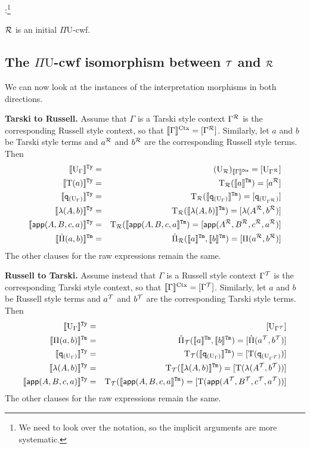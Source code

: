 \documentclass{lmcs}
\def\UU{\mathrm{U}}
\def\Ta{\mathrm{T}}
\def\Pihat{\hat{\Pi}}
\newcommand{\intCtxU}[1]{\llbracket #1 \rrbracket^\RawCtx}
\newcommand{\intTyU}[1]{\llbracket #1 \rrbracket^\RawTy}
\newcommand{\intTmU}[1]{\llbracket #1 \rrbracket^\RawTm}
\begin{document}
:\footnote{We need to look over the notation, so the implicit arguments are more systematic.}

\begin{thm}\label{theom:initial_cwf}
  $\mathcal{R}$ is an initial $\Pi\UU$-cwf.
\end{thm}

\subsection{The $\Pi\UU$-cwf isomorphism between ${\mathcal T}$ and $\mathcal{R}$}
We can now look at the instances of the interpretation morphisms in both directions.

{\bf Tarski to Russell.} Assume that $\Gamma$ is a Tarski style context $\Gamma^{\mathcal{R}}$ is the corresponding Russell style context, so that $\llbracket \Gamma \rrbracket^{\mathrm{Ctx}} = [ \Gamma^{\mathcal{R}} ]$. Similarly, let $a$ and $b$ be Tarski style terms and $a^{\mathcal{R}}$ and $b^{\mathcal{R}}$ are the corresponding Russell style terms. Then
\begin{eqnarray*}
 \intTyU{\UU_\Gamma} &=& (\UU_\R)_{\intCtxU{\Gamma}}
 = [\UU_{\Gamma^\R}]\\
\intTyU{\Ta(a)} &=& \Ta_\R(\intTmU{a}) 
= [a^\R]\\
\intTyU{\qI_{(\UU_\Gamma)}}&=& \Ta_\R(\intTmU{\qI_{(\UU_\Gamma)}}) = [ \qI_{(\UU_{\Gamma^\R})} ]\\
\intTyU{\lambda(A,b)}&=& \Ta_\R(\intTmU{\lambda(A,b)}) = [ \lambda(A^\R ,b^\R ) ]\\
\intTyU{\app(A,B,c,a)}&=& \Ta_\R(\intTmU{\app(A,B,c,a}) = [ \app(A^\R ,B^\R ,c^\R ,a^\R ) ]\\
\intTmU{\Pihat(a,b)}&=& \Pihat_\R(\intTmU{a},\intTmU{b})
= [\Pi(a^\R,b^\R)]
\end{eqnarray*}
The other clauses for the raw expressions remain the same.

{\bf Russell to Tarski.} 
Assume instead that $\Gamma$ is a Russell style context $\Gamma^{\mathcal T}$ is the corresponding Tarski style context, so that $\llbracket \Gamma \rrbracket^{\mathrm{Ctx}} = [ \Gamma^{\mathcal T} ]$. Similarly, let $a$ and $b$ be Russell style terms and $a^{\mathcal T}$ and $b^{\mathcal T}$ are the corresponding Tarski style terms. Then
\begin{eqnarray*}
\intTyU{\UU_\Gamma} &=& [ \UU_{\Gamma^\T} ]\\
\intTmU{\Pi(a,b)}&=& \hat{\Pi}_\T(\intTmU{a},\intTmU{b}) = [ \hat{\Pi}(a^\T,b^\T) ]\\
\intTyU{\qI_{(\UU_\Gamma)}}&=& \Ta_\T(\intTmU{\qI_{(\UU_\Gamma)}}) = [ \Ta(\qI_{(\UU_{\Gamma^\T})}) ]\\
\intTyU{\lambda(A,b)}&=& \Ta_\T(\intTmU{\lambda(A,b)}) = [ \Ta(\lambda(A^\T ,b^\T )) ]\\
\intTyU{\app(A,B,c,a)}&=& \Ta_\T(\intTmU{\app(A,B,c,a}) = [ \Ta(\app(A^\T ,B^\T ,c^\T ,a^\T )) ]
\end{eqnarray*}
The other clauses for the raw expressions remain the same.
\end{document}
